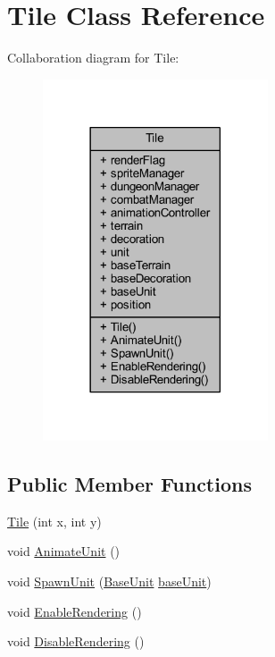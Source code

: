 \hypertarget{class_tile}{}\section{Tile Class Reference}
\label{class_tile}


Collaboration diagram for Tile\+:
\nopagebreak
\begin{figure}[H]
\begin{center}
\leavevmode
\includegraphics[width=189pt]{class_tile__coll__graph}
\end{center}
\end{figure}
\subsection*{Public Member Functions}
\begin{DoxyCompactItemize}
\item 
\mbox{\hyperlink{class_tile_ac4b178062ea8879968150b8a79830267}{Tile}} (int x, int y)
\item 
void \mbox{\hyperlink{class_tile_a87c523416006468a2791d61bf3be54ca}{Animate\+Unit}} ()
\item 
void \mbox{\hyperlink{class_tile_a183188c193a2ba5b62c8cdfc6d63471d}{Spawn\+Unit}} (\mbox{\hyperlink{class_base_unit}{Base\+Unit}} \mbox{\hyperlink{class_tile_a2d5020851ac36840a83e8933da9c2b1e}{base\+Unit}})
\item 
void \mbox{\hyperlink{class_tile_a1baa5fe3ab8f887e8985a85fba21210a}{Enable\+Rendering}} ()
\item 
void \mbox{\hyperlink{class_tile_abf58797ff0c2df3eddfc9854c3f61dd2}{Disable\+Rendering}} ()
\end{DoxyCompactItemize}
